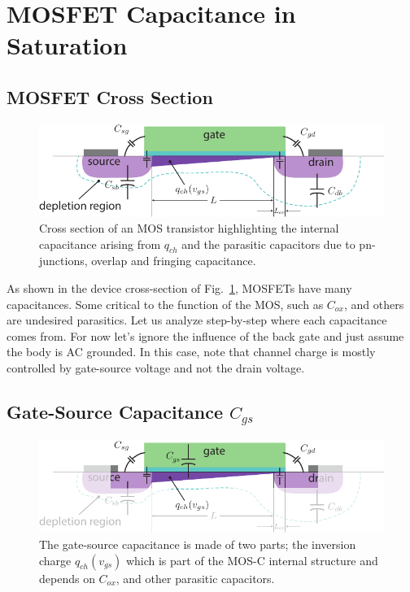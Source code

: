 \section{MOSFET Capacitance in Saturation}



\subsection{MOSFET Cross Section}

\begin{figure}[tb]
\begin{center}
\includegraphics[width=.75\columnwidth]{mos_caps_xsect}
\end{center}
\caption{Cross section of an MOS transistor highlighting the internal capacitance arising from $q_{ch}$ and the parasitic capacitors due to pn-junctions, overlap and fringing capacitance.} \label{fig:moscapsxsect}
\end{figure}

As shown in the device cross-section of Fig.~\ref{fig:moscapsxsect}, MOSFETs have many capacitances. Some critical to the function of the MOS, such as $C_{ox}$, and others are undesired parasitics.  Let us analyze step-by-step where each capacitance comes from.  For now let's ignore the influence of the back gate and just assume the body is AC grounded. In this case, note that channel charge is mostly controlled by gate-source voltage and not the drain voltage.  



\subsection{Gate-Source Capacitance $C_{gs}$}

\begin{figure}[tb]
\begin{center}
\includegraphics[width=.75\columnwidth]{mos_caps_Cgs}
\end{center}
\caption{The gate-source capacitance is made of two parts; the inversion charge $q_{ch}(v_{gs})$ which is part of the MOS-C internal structure and depends on $C_{ox}$, and other parasitic capacitors. } \label{fig:mos_caps_Cgs}
\end{figure}

